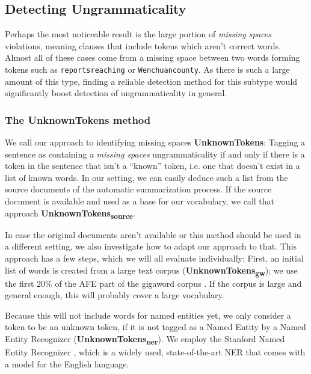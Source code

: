 \documentclass[a4paper,10pt]{scrartcl}
\theoremstyle{style}
\begin{document}
\subsection{Detecting Ungrammaticality}
\label{sec_unknowntokens}
Perhaps the most noticeable result is the large portion of \textit{missing spaces} violations, meaning clauses that include tokens which aren't correct words. Almost all of these cases come from a missing space between two words forming tokens such as \texttt{reportsreaching} or \texttt{Wenchuancounty}. As there is such a large amount of this type, finding a reliable detection method for this subtype would significantly boost detection of ungrammaticality in general.

\subsubsection{The UnknownTokens method}
We call our approach to identifying missing spaces \textbf{UnknownTokens}: Tagging a sentence as containing a \textit{missing spaces} ungrammaticality if and only if there is a token in the sentence that isn't a ``known'' token, i.e. one that doesn't exist in a list of known words. In our setting, we can easily deduce such a list from the source documents of the automatic summarization process. If the source document is available and used as a base for our vocabulary, we call that approach \textbf{UnknownTokens\textsubscript{source}}.

In case the original documents aren't available or this method should be used in a different setting, we also investigate how to adapt our approach to that. This approach has a few steps, which we will all evaluate individually:
First, an initial list of words is created from a large text corpus (\textbf{UnknownTokens\textsubscript{gw}}); we use the first 20\% of the AFE part of the gigaword corpus \citep{gigaword}. If the corpus is large and general enough, this will probably cover a large vocabulary.%

Because this will not include words for named entities yet, we only consider a token to be an unknown token, if it is not tagged as a Named Entity by a Named Entity Recognizer (\textbf{UnknownTokens\textsubscript{ner}}). We employ the Stanford Named Entity Recognizer \citep{stanfordNER}, which is a widely used, state-of-the-art NER that comes with a model for the English language.
\end{document}

